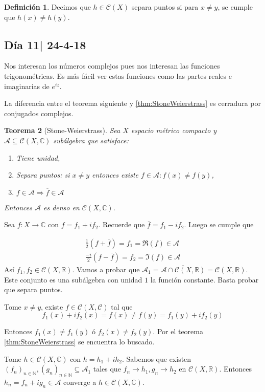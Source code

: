\documentclass[12pt]{article}
\theoremstyle{plain}
\newtheorem{Th}{Teorema}[subsection]   %
\theoremstyle{definition}
\newtheorem{Def}[Th]{Definición}       %
\theoremstyle{remark}
\numberwithin{equation}{section}
\newcommand{\bC}{\mathbb{C}}        %
\newcommand{\bN}{\mathbb{N}}        %
\newcommand{\bR}{\mathbb{R}}        %
\newcommand{\cA}{\mathcal{A}}       %
\newcommand{\cC}{\mathcal{C}}       %
\renewcommand{\:}{\colon}           %
\begin{document}
\begin{multicols}{2}
\begin{Def}
  Decimos que $h\in\cC(X)$ separa puntos si para $x\neq y$, se cumple que $h(x)\neq h(y)$.
\end{Def}

 \subsection{Día 11| 24-4-18}
 Nos interesan los números complejos pues nos interesan las funciones trigonométricas. Es más fácil ver estas funciones como las partes reales e imaginarias de $e^{iz}$.\par
 La diferencia entre el teorema siguiente y \ref{thm:StoneWeierstrass} es cerradura por conjugados complejos.
 \begin{Th}[Stone-Weierstrass]
   Sea $X$ espacio métrico compacto y $\cA\subseteq\cC(X,\bC)$ subálgebra que satisface:
   \begin{enumerate}
     \item Tiene unidad,
     \item Separa puntos: si $x\neq y$ entonces existe $f\in\cA\colon f(x)\neq f(y)$,
     \item $f\in\cA\Rightarrow \overline{f}\in\cA$
   \end{enumerate}
   Entonces $\cA$ es denso en $\cC(X,\bC)$.
 \end{Th}



 \begin{ptcbp}

 Sea $f\colon X\to\bC$ con $f=f_1+if_2$. Recuerde que $\overline{f}=f_1-if_2$. Luego se cumple que

 \begin{gather*}
   \frac{1}{2}(f+\overline{f})=f_1=\Re(f)\in\cA \\
   \frac{-i}{2}(f-\overline{f})=f_2=\Im(f)\in\cA
 \end{gather*}
 Así $f_1,f_2\in\cC(X,\bR)$. Vamos a probar que $\cA_1=\overline{\cA\cap\cC(X,\bR)}=\cC(X,\bR)$. Este conjunto es una subálgebra con unidad $\mathit{1}$ la función constante. Basta probar que separa puntos.\par
 Tome $x\neq y$, existe $f\in\cC(X,\cC)$ tal que
 $$f_1(x)+if_2(x)=f(x)\neq f(y)=f_1(y)+if_2(y)$$

 Entonces $f_1(x)\neq f_1(y)$ ó $f_2(x)\neq f_2(y)$. Por el teorema \ref{thm:StoneWeierstrass} se encuentra lo buscado. \par
 Tome $h\in\cC(X,\bC)$ con $h=h_1+ih_2$. Sabemos que existen $(f_n)_{n\in\bN},(g_n)_{n\in\bN}\subseteq\cA_1$ tales que $f_n\to h_1, g_n\to h_2$ en $\cC(X,\bR)$. Entonces $h_n=f_n+ig_n\in\cA$ converge a $h\in\cC(X,\bC)$.


\end{ptcbp}
\end{multicols}
\end{document}
